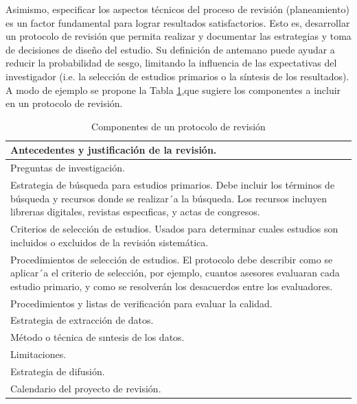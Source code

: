 Asimismo, especificar los aspectos técnicos del proceso de revisión (planeamiento) es un factor fundamental para lograr resultados satisfactorios. Esto es, desarrollar un protocolo de revisión que permita realizar y documentar las estrategias y toma de decisiones de diseño del estudio. Su definición de antemano puede ayudar a reducir la probabilidad de sesgo, limitando la influencia de las expectativas del investigador (i.e. la selección de estudios primarios o la síntesis de los resultados). A modo de ejemplo se propone la Tabla \ref{tab_protocolcomponents},que sugiere los componentes a incluir en un protocolo de revisión.
\begin{table}[H]
    \begin{center}
     \caption{\label{tab_protocolcomponents} Componentes de un protocolo de revisión}
        \begin{tabular}{ |p{12cm}| } 
        \hline
        Antecedentes y justificación de la revisión. \\
        \hline
        Preguntas de investigación.\\
        \hline
        Estrategia de búsqueda para estudios primarios. Debe incluir los términos de búsqueda y recursos donde se realizar´a la búsqueda. Los recursos incluyen librerıas digitales, revistas especıficas, y actas de congresos.\\
        \hline
        Criterios de selección de estudios. Usados para determinar cuales estudios son incluidos o excluidos de la revisión sistemática.\\
        \hline
        Procedimientos de selección de estudios. El protocolo debe describir como se aplicar´a el criterio de selección, por ejemplo, cuantos asesores evaluaran cada estudio primario, y como se resolverán los desacuerdos entre los evaluadores.\\
        \hline
        Procedimientos y listas de verificación para evaluar la calidad.\\
        \hline
        Estrategia de extracción de datos.\\
        \hline
        Método o técnica de sıntesis de los datos.\\
        \hline
        Limitaciones.\\
        \hline
        Estrategia de difusión.\\
        \hline
        Calendario del proyecto de revisión.\\
        \hline
        \end{tabular}
    \end{center}
\end{table}

